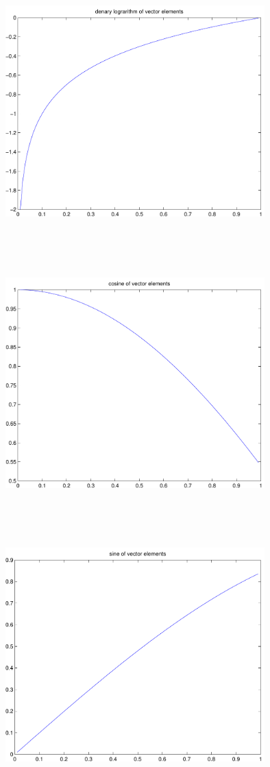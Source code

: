 \documentclass[9pt]{article}
\theoremstyle{plain}
\theoremstyle{definition}
\theoremstyle{remark}
\numberwithin{equation}{section}
\begin{document}
\includegraphics[width=10.0cm,height=10.0cm]{klVSLLog10.pdf}

\includegraphics[width=10.0cm,height=10.0cm]{klVSLCos.pdf}

\includegraphics[width=10.0cm,height=10.0cm]{klVSLSin.pdf}
\end{document}
